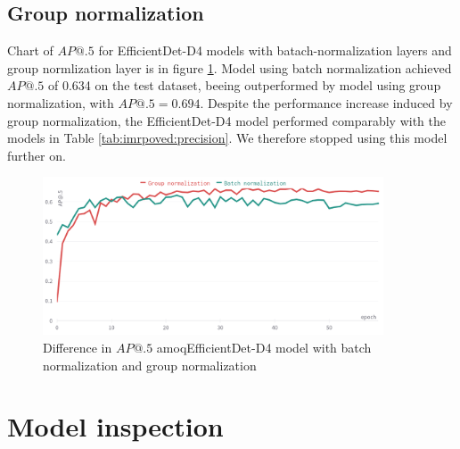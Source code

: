 \subsection{Group normalization}
Chart of $AP@.5$ for EfficientDet-D4 models with batach-normalization layers and group normlization layer is in figure \ref{fig:batch_group_diff}. Model using batch normalization achieved $AP@.5$ of 0.634 on the test dataset, beeing outperformed by model using group normalization, with $AP@.5=0.694$. Despite the performance increase induced by group normalization, the EfficientDet-D4 model performed comparably with the models in Table \ref{tab:imrpoved:precision}. We therefore stopped using this model further on.
\begin{figure}[H]
    \centering
    \includegraphics[width=0.9\textwidth]{images/group_norm_batch_norm.png}
    \caption{Difference in $AP@.5$ amoqEfficientDet-D4 model with batch normalization and group normalization}
    \label{fig:batch_group_diff}
\end{figure}

\section{Model inspection}
\label{sec:model_inspection_results}

